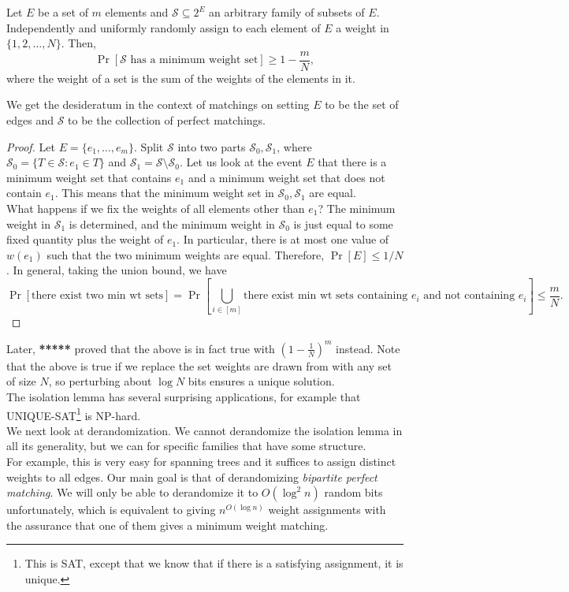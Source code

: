 		\begin{flem}
			Let $E$ be a set of $m$ elements and $\mathcal{S} \subseteq 2^E$ an arbitrary family of subsets of $E$. Independently and uniformly randomly assign to each element of $E$ a weight in $\{1,2,\ldots,N\}$. Then,
			\[ \Pr\left[ \mathcal{S} \text{ has a minimum weight set} \right] \ge 1 - \frac{m}{N}, \]
			where the weight of a set is the sum of the weights of the elements in it.
		\end{flem}
		We get the desideratum in the context of matchings on setting $E$ to be the set of edges and $\mathcal{S}$ to be the collection of perfect matchings. 
		\begin{proof}
			Let $E = \{e_1,\ldots,e_m\}$. Split $\mathcal{S}$ into two parts $\mathcal{S}_0,\mathcal{S}_1$, where $\mathcal{S}_0 = \{ T \in \mathcal{S} : e_1 \in T \}$ and $\mathcal{S}_1 = \mathcal{S} \setminus \mathcal{S}_0$. Let us look at the event $E$ that there is a minimum weight set that contains $e_1$ and a minimum weight set that does not contain $e_1$. This means that the minimum weight set in $\mathcal{S}_0,\mathcal{S}_1$ are equal.\\
			What happens if we fix the weights of all elements other than $e_1$? The minimum weight in $\mathcal{S}_1$ is determined, and the minimum weight in $\mathcal{S_0}$ is just equal to some fixed quantity plus the weight of $e_1$. In particular, there is at most one value of $w(e_1)$ such that the two minimum weights are equal. Therefore, $\Pr[E] \le 1/N$. In general, taking the union bound, we have
			\[ \Pr[\text{there exist two min wt sets}] = \Pr\left[ \bigcup_{i \in [m]} \text{there exist min wt sets containing $e_i$ and not containing $e_i$} \right] \le \frac{m}{N}. \]
		\end{proof}
		Later, \textbf{*****} proved that the above is in fact true with $\left( 1 - \frac{1}{N} \right)^m$ instead. Note that the above is true if we replace the set weights are drawn from with any set of size $N$, so perturbing about $\log N$ bits ensures a unique solution.\\

		The isolation lemma has several surprising applications, for example that \textsf{UNIQUE-SAT}\footnote{This is \textsf{SAT}, except that we know that if there is a satisfying assignment, it is unique.} is \textsf{NP}-hard.\\

		We next look at derandomization. We cannot derandomize the isolation lemma in all its generality, but we can for specific families that have some structure.\\
		For example, this is very easy for spanning trees and it suffices to assign distinct weights to all edges. Our main goal is that of derandomizing \emph{bipartite perfect matching}. We will only be able to derandomize it to $O(\log^2n)$ random bits unfortunately, which is equivalent to giving $n^{O(\log n)}$ weight assignments with the assurance that one of them gives a minimum weight matching.\\

